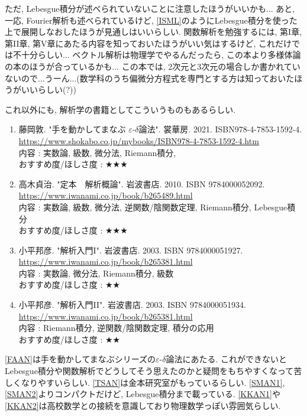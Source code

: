 \documentclass[10pt,a4paper]{jsarticle}
\begin{document}
    ただ, Lebesgue積分が述べられていないことに注意したほうがいいかも... あと, 一応, Fourier解析も述べられているけど, \ref{ISML}のようにLebesgue積分を使った上で展開しなおしたほうが見通しはいいらしい. 関数解析を勉強するには, 第I章, 第II章, 第V章にあたる内容を知っておいたほうがいい気はするけど, これだけでは不十分らしい... ベクトル解析は物理学でやるんだったら, この本より多様体論の本のほうが合っているかも... この本では, 2次元と3次元の場合しか書かれていないので...うーん...(数学科のうち偏微分方程式を専門とする方は知っておいたほうがいいらしい(?))\par
    これ以外にも, 解析学の書籍としてこういうものもあるらしい. 
    \begin{enumerate}
        \renewcommand{\theenumi}{[AN\arabic{enumi}]}
        \renewcommand{\labelenumi}{\theenumi}
        \setcounter{enumi}{2}
        \item \label{FAAN} 藤岡敦. "手を動かしてまなぶ $\varepsilon$-$\delta$論法". 裳華房. 2021. ISBN978-4-7853-1592-4. \\
        \url{https://www.shokabo.co.jp/mybooks/ISBN978-4-7853-1592-4.htm} \\
        内容 : 実数論, 級数, 微分法, Riemann積分, \\
        おすすめ度/ほしさ度 : $\bigstar \bigstar \bigstar $
        \item \label{TSAN} 高木貞治. "定本　解析概論". 岩波書店. 2010. ISBN	9784000052092. \\
        \url{https://www.iwanami.co.jp/book/b265489.html} \\
        内容 : 実数論, 級数, 微分法, 逆関数/陰関数定理, Riemann積分, Lebesgue積分\\
        おすすめ度/ほしさ度 : $\bigstar \bigstar \bigstar $
        \item \label{KKAN1} 小平邦彦. "解析入門I". 岩波書店. 2003. ISBN	9784000051927. \\
        \url{https://www.iwanami.co.jp/book/b265381.html} \\
        内容 : 実数論, 微分法, Riemann積分, 級数\\
        おすすめ度/ほしさ度 : $\bigstar \bigstar $
        \item \label{KKAN2} 小平邦彦. "解析入門II". 岩波書店. 2003. ISBN	9784000051934. \\
        \url{https://www.iwanami.co.jp/book/b265381.html} \\
        内容 : Riemann積分, 逆関数/陰関数定理, 積分の応用\\
        おすすめ度/ほしさ度 : $\bigstar \bigstar $
    \end{enumerate}\par
    \ref{FAAN}は手を動かしてまなぶシリーズの$\varepsilon$-$\delta$論法にあたる. これができないとLebesgue積分や関数解析でどうしてそう思えたのかと疑問をもちやすくなって苦しくなりやすいらしい. \ref{TSAN}は金本研究室がもっているらしい. \ref{SMAN1}, \ref{SMAN2}よりコンパクトだけど, Lebesgue積分まで載っている. \ref{KKAN1}や\ref{KKAN2}は高校数学との接続を意識しており物理数学っぽい雰囲気らしい. 
\end{document}
